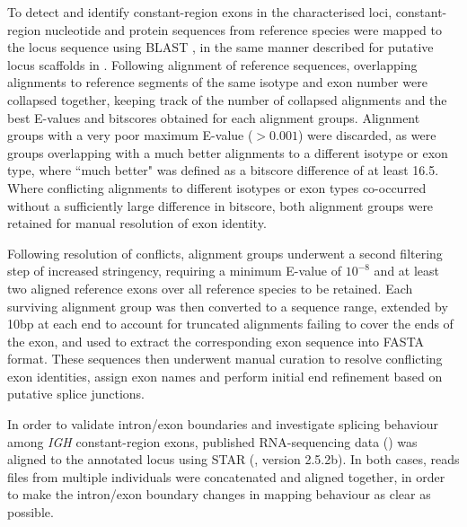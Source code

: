 To detect and identify constant-region exons in the characterised loci, constant-region nucleotide and protein sequences from reference species were mapped to the locus sequence using BLAST \citep{altschul1990blast,altschul1997blast}, in the same manner described for putative locus scaffolds in .
Following alignment of reference sequences, overlapping alignments to reference segments of the same isotype and exon number were collapsed together, keeping track of the number of collapsed alignments and the best E-values and bitscores obtained for each alignment groups. Alignment groups with a very poor maximum E-value ($> 0.001$) were discarded, as were groups overlapping with a much better alignments to a different isotype or exon type, where ``much better" was defined as a bitscore difference of at least 16.5. Where conflicting alignments to different isotypes or exon types co-occurred without a sufficiently large difference in bitscore, both alignment groups were retained for manual resolution of exon identity.

Following resolution of conflicts, alignment groups underwent a second filtering step of increased stringency, requiring a minimum E-value of $10^{-8}$ and at least two aligned reference exons over all reference species to be retained. Each surviving alignment group was then converted to a sequence range, extended by 10bp at each end to account for truncated alignments failing to cover the ends of the exon, and used to extract the corresponding exon sequence into FASTA format. These sequences then underwent manual curation to resolve conflicting exon identities, assign exon names and perform initial end refinement based on putative splice junctions.

In order to validate intron/exon boundaries and investigate splicing behaviour among \textit{IGH} constant-region exons, published RNA-sequencing data () was aligned to the annotated locus using STAR (\citep{dobin2013star}, version 2.5.2b). In both cases, reads files from multiple individuals were concatenated and aligned together, in order to make the intron/exon boundary changes in mapping behaviour as clear as possible. %


